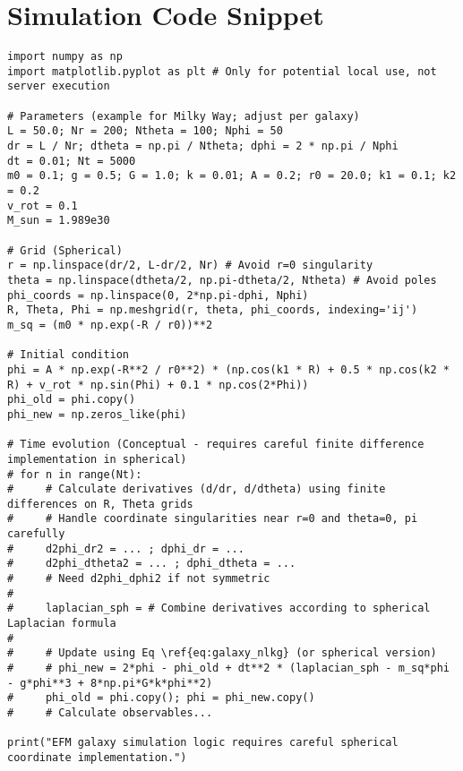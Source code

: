 \documentclass[11pt]{article}
\begin{document}
\section{Simulation Code Snippet}
\begin{lstlisting}
import numpy as np
import matplotlib.pyplot as plt # Only for potential local use, not server execution

# Parameters (example for Milky Way; adjust per galaxy)
L = 50.0; Nr = 200; Ntheta = 100; Nphi = 50
dr = L / Nr; dtheta = np.pi / Ntheta; dphi = 2 * np.pi / Nphi
dt = 0.01; Nt = 5000
m0 = 0.1; g = 0.5; G = 1.0; k = 0.01; A = 0.2; r0 = 20.0; k1 = 0.1; k2 = 0.2
v_rot = 0.1
M_sun = 1.989e30

# Grid (Spherical)
r = np.linspace(dr/2, L-dr/2, Nr) # Avoid r=0 singularity
theta = np.linspace(dtheta/2, np.pi-dtheta/2, Ntheta) # Avoid poles
phi_coords = np.linspace(0, 2*np.pi-dphi, Nphi)
R, Theta, Phi = np.meshgrid(r, theta, phi_coords, indexing='ij')
m_sq = (m0 * np.exp(-R / r0))**2

# Initial condition
phi = A * np.exp(-R**2 / r0**2) * (np.cos(k1 * R) + 0.5 * np.cos(k2 * R) + v_rot * np.sin(Phi) + 0.1 * np.cos(2*Phi))
phi_old = phi.copy()
phi_new = np.zeros_like(phi)

# Time evolution (Conceptual - requires careful finite difference implementation in spherical)
# for n in range(Nt):
#     # Calculate derivatives (d/dr, d/dtheta) using finite differences on R, Theta grids
#     # Handle coordinate singularities near r=0 and theta=0, pi carefully
#     d2phi_dr2 = ... ; dphi_dr = ...
#     d2phi_dtheta2 = ... ; dphi_dtheta = ...
#     # Need d2phi_dphi2 if not symmetric
#
#     laplacian_sph = # Combine derivatives according to spherical Laplacian formula
#
#     # Update using Eq \ref{eq:galaxy_nlkg} (or spherical version)
#     # phi_new = 2*phi - phi_old + dt**2 * (laplacian_sph - m_sq*phi - g*phi**3 + 8*np.pi*G*k*phi**2)
#     phi_old = phi.copy(); phi = phi_new.copy()
#     # Calculate observables...

print("EFM galaxy simulation logic requires careful spherical coordinate implementation.")
\end{lstlisting}
\end{document}
